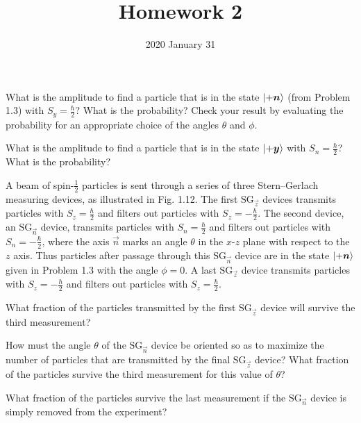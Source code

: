 \documentclass{../phys116}
\title{Homework 2}
\author{}
\date{2020 January 31}
\begin{document}
\begin{exercise}
  \begin{problems}
  \item What is the amplitude to find a particle that is in the state
    \(\ket{+\vec n}\) (from Problem 1.3) with \(S_y = \frac \hbar 2\)?
    What is the probability?  Check your result by evaluating the
    probability for an appropriate choice of the angles \(\theta\) and
    \(\phi\).
  \item What is the amplitude to find a particle that is in the state
    \(\ket{+\vec y}\) with \(S_n = \frac \hbar 2\)?  What is the
    probability?
  \end{problems}
\end{exercise}

\begin{solution}
\end{solution}

\begin{exercise}
  \newcommand{\SG}{\mathrm{SG}}

  A beam of spin-\(\frac 1 2\) particles is sent through a series of
  three Stern--Gerlach measuring devices, as illustrated in Fig. 1.12.
  The first \(\SG_{\vec z}\) devices transmits particles with
  \(S_z = \frac \hbar 2\) and filters out particles with
  \(S_z = -\frac \hbar 2\).  The second device, an \(\SG_{\vec n}\)
  device, transmits particles with \(S_n = \frac \hbar 2\) and filters
  out particles with \(S_n = -\frac \hbar 2\), where the axis
  \(\vec n\) marks an angle \(\theta\) in the \(x\)-\(z\) plane with
  respect to the \(z\) axis.  Thus particles after passage through
  this \(\SG_{\vec n}\) device are in the state \(\ket{+\vec n}\)
  given in Problem 1.3 with the angle \(\phi = 0\).  A last
  \(\SG_{\vec z}\) device transmits particles with
  \(S_z = -\frac \hbar 2\) and filters out particles with
  \(S_z = \frac \hbar 2\).
  \begin{problems}
  \item What fraction of the particles transmitted by the first
    \(\SG_{\vec z}\) device will survive the third measurement?
  \item How must the angle \(\theta\) of the \(\SG_{\vec n}\) device
    be oriented so as to maximize the number of particles that are
    transmitted by the final \(\SG_{\vec z}\) device?  What fraction
    of the particles survive the third measurement for this value of
    \(\theta\)?
  \item What fraction of the particles survive the last measurement if
    the \(\SG_{\vec n}\) device is simply removed from the experiment?
  \end{problems}
\end{exercise}
\end{document}
